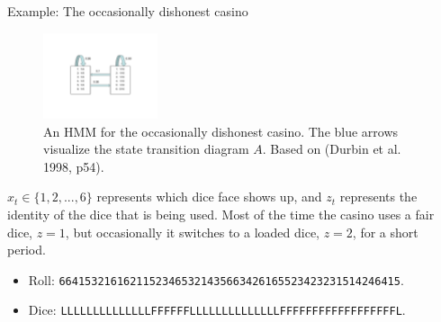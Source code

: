 \documentclass[10pt,mathserif]{beamer}
\begin{document}

\begin{frame}{Example: The occasionally dishonest casino}
\begin{figure}[h]
\centering
\includegraphics[width=0.3\textwidth]{casino}
\caption{An HMM for the occasionally dishonest casino. The blue arrows visualize the state transition diagram $A$. Based on (Durbin et al. 1998, p54).}
\end{figure}

$x_t\in \{1,2,...,6\}$ represents which dice face shows up, and $z_t$ represents the identity of the dice that is being used. Most of the time the casino uses a fair dice, $z = 1$, but occasionally it switches to a loaded dice, $z = 2$, for a short period.

\begin{itemize}
    \item Roll: \texttt{66415321616211523465321435663426165523423231514246415}.
    \item Dice: \texttt{LLLLLLLLLLLLLLFFFFFFLLLLLLLLLLLLLLFFFFFFFFFFFFFFFFFFL}.
\end{itemize}
\end{frame}
\end{document}

